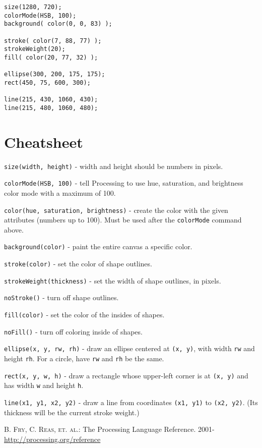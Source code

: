 \documentclass[
]{leaflet}
\begin{document}
\begin{lstlisting}
size(1280, 720);
colorMode(HSB, 100);
background( color(0, 0, 83) );

stroke( color(7, 88, 77) );
strokeWeight(20);
fill( color(20, 77, 32) );

ellipse(300, 200, 175, 175);
rect(450, 75, 600, 300);

line(215, 430, 1060, 430);
line(215, 480, 1060, 480);
\end{lstlisting}

\section{Cheatsheet}

\texttt{size(width, height)} - width and height should be numbers in pixels.

\texttt{colorMode(HSB, 100)} - tell Processing to use hue, saturation, and brightness color mode with a maximum of 100.

\texttt{color(hue, saturation, brightness)} - create the color with the given attributes (numbers up to 100).
Must be used after the \texttt{colorMode} command above.

\texttt{background(color)} - paint the entire canvas a specific color.

\texttt{stroke(color)} - set the color of shape outlines.

\texttt{strokeWeight(thickness)} - set the width of shape outlines, in pixels.

\texttt{noStroke()} - turn off shape outlines.

\texttt{fill(color)} - set the color of the insides of shapes.

\texttt{noFill()} - turn off coloring inside of shapes.

\texttt{ellipse(x, y, rw, rh)} - draw an ellipse centered at \texttt{(x, y)}, with width \texttt{rw} and height \texttt{rh}.
For a circle, have \texttt{rw} and \texttt{rh} be the same.

\texttt{rect(x, y, w, h)} - draw a rectangle whose upper-left corner is at \texttt{(x, y)} and has width \texttt{w} and height \texttt{h}.

\texttt{line(x1, y1, x2, y2)} - draw a line from coordinates \texttt{(x1, y1)} to \texttt{(x2, y2)}.
(Its thickness will be the current stroke weight.)


\begin{thebibliography}{000}
  \textsc{B. Fry, C. Reas, et. al.}: The Processing Language Reference. 2001-\\
  \url{http://processing.org/reference}
\end{thebibliography}

\loggingall
\end{document}
